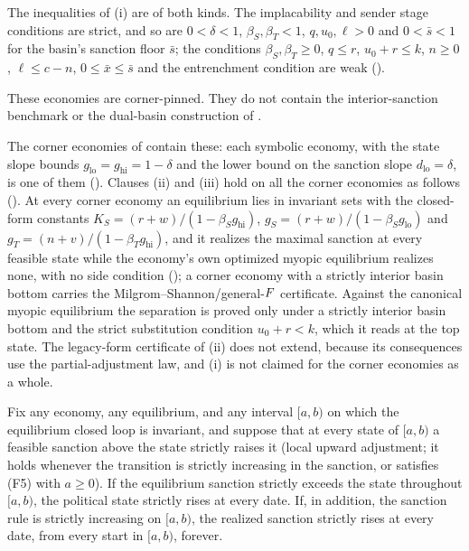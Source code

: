 The inequalities of (i) are of both kinds. The implacability and sender stage
conditions are strict, and so are $0<\delta<1$, $\beta_S,\beta_T<1$,
$q,u_0,\ell>0$ and $0<\bar s<1$ for the basin's sanction floor $\bar s$; the
conditions $\beta_S,\beta_T\ge0$, $q\le r$, $u_0+r\le k$, $n\ge0$,
$\ell\le c-n$, $0\le\bar x\le\bar s$ and the entrenchment condition are weak
().

These economies are corner-pinned. They do not contain the interior-sanction
benchmark or the dual-basin construction of .

The corner economies of  contain
these: each symbolic economy, with the state slope bounds
$g_{\mathrm{lo}}=g_{\mathrm{hi}}=1-\delta$ and the lower bound on the sanction slope
$d_{\mathrm{lo}}=\delta$, is one of them
(). Clauses (ii) and (iii) hold on all the corner economies
as follows (). At every corner economy
an equilibrium lies in invariant sets with the closed-form constants
$K_S=(r+w)/(1-\beta_Sg_{\mathrm{hi}})$, $g_S=(r+w)/(1-\beta_Sg_{\mathrm{lo}})$
and $g_T=(n+v)/(1-\beta_Tg_{\mathrm{hi}})$, and it realizes the maximal sanction
at every feasible state while the economy's own optimized myopic equilibrium
realizes none, with no side condition (); a
corner economy with a strictly interior basin bottom carries the
Milgrom--Shannon/general-$F$ certificate. Against the canonical myopic
equilibrium the separation is proved only under a strictly interior basin bottom
and the strict substitution condition $u_0+r<k$, which it reads at the top state. The
legacy-form certificate of (ii) does not extend, because its consequences use
the partial-adjustment law, and (i) is not claimed for the corner economies as a whole.

\begin{proposition}
\label{prop:strict-escalation}
Fix any economy, any equilibrium, and any interval $[a,b)$ on which the
equilibrium closed loop is invariant, and suppose that at every state of
$[a,b)$ a feasible sanction above the state strictly raises it (local upward
adjustment; it holds whenever the transition is strictly increasing in the
sanction, or satisfies \textup{(F5)} with $a\ge0$). If the equilibrium sanction
strictly exceeds the state throughout $[a,b)$, the political state
strictly rises at every date. If, in addition, the sanction rule is
strictly increasing on $[a,b)$, the realized sanction strictly rises at
every date, from every start in $[a,b)$, forever.
\end{proposition}

